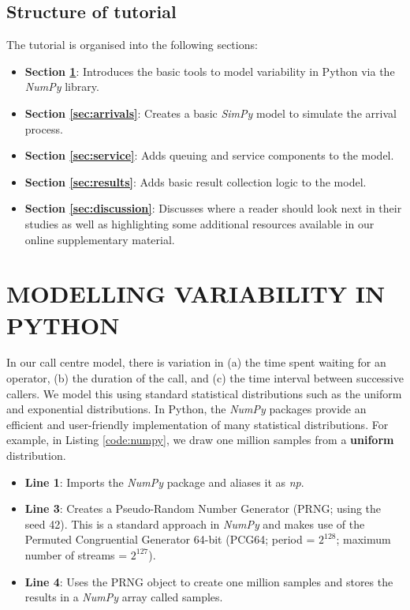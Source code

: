 \documentclass{swpaperproc}
\theoremstyle{sw}
\begin{document}
\subsection{Structure of tutorial}

The tutorial is organised into the following sections:

\begin{itemize}
    \item \textbf{Section \ref{sec:variable}}: Introduces the basic tools to model variability in Python via the \textit{NumPy} library.
    \item \textbf{Section \ref{sec:arrivals}}: Creates a basic \textit{SimPy} model to simulate the arrival process.
    \item \textbf{Section \ref{sec:service}}: Adds queuing and service components to the model.
    \item \textbf{Section \ref{sec:results}}: Adds basic result collection logic to the model.
    \item \textbf{Section \ref{sec:discussion}}: Discusses where a reader should look next in their studies as well as highlighting some additional resources available in our online supplementary material.
\end{itemize}


\section{MODELLING VARIABILITY IN PYTHON}
\label{sec:variable}

In our call centre model, there is variation in (a) the time spent waiting for an operator, (b) the duration of the call, and (c) the time interval between successive callers. We model this using standard statistical distributions such as the uniform and exponential distributions. In Python, the \textit{NumPy} packages provide an efficient and user-friendly implementation of many statistical distributions. For example, in Listing \ref{code:numpy}, we draw one million samples from a \textbf{uniform} distribution.

\begin{itemize}
    \item \textbf{Line 1}: Imports the \textit{NumPy} package and aliases it as \textit{np}.
    \item \textbf{Line 3}: Creates a Pseudo-Random Number Generator (PRNG; using the seed 42). This is a standard approach in \textit{NumPy} and makes use of the Permuted Congruential Generator 64-bit (PCG64; period = $2^{128}$; maximum number of streams = $2^{127}$).
    \item \textbf{Line 4}: Uses the PRNG object to create one million samples and stores the results in a \textit{NumPy} array called samples.
\end{itemize}
\end{document}
